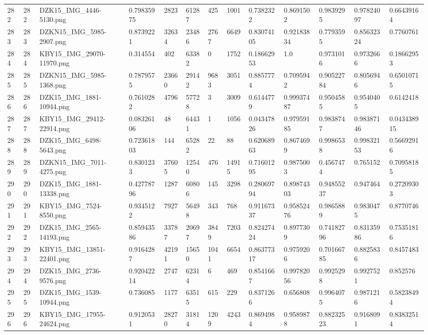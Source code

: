 \documentclass[11pt, a4paper, twoside]{report}
\begin{document}
\begin{longtable}[c]{@{}lllllllllllll@{}}
282 & 282 & DZK15\_IMG\_4446-5130.png & 0.79835975 & 2823 & 61287 & 425 & 1001 & 0.7382322 & 0.8691502 & 0.9839295 & 0.97824097 & 0.66439164 \\
283 & 283 & DZKN15\_IMG\_5985-2907.png & 0.8739221 & 32634 & 23486 & 2767 & 6649 & 0.83074105 & 0.92183834 & 0.7793595 & 0.85632324 & 0.7760761 \\
284 & 284 & KBY15\_IMG\_29070-11970.png & 0.314554 & 402 & 63382 & 0 & 1752 & 0.18662953 & 1.0 & 0.9731016 & 0.9732666 & 0.18662953 \\
285 & 285 & DZKN15\_IMG\_5985-1368.png & 0.7879575 & 23660 & 29142 & 9683 & 3051 & 0.8857774 & 0.7095942 & 0.90522784 & 0.8056946 & 0.65010715 \\
286 & 286 & DZK15\_IMG\_1881-10944.png & 0.7610282 & 4796 & 57728 & 3 & 3009 & 0.6144779 & 0.99937487 & 0.9504585 & 0.9540405 & 0.6142418 \\
287 & 287 & KBY15\_IMG\_29412-22914.png & 0.08326106 & 48 & 64431 & 1 & 1056 & 0.04347826 & 0.97959185 & 0.9838747 & 0.98387146 & 0.043438915 \\
288 & 288 & DZK15\_IMG\_6498-5643.png & 0.72361803 & 144 & 65282 & 22 & 88 & 0.62068963 & 0.8674699 & 0.9986538 & 0.99832153 & 0.56692916 \\
289 & 289 & DZKN15\_IMG\_7011-4275.png & 0.8301233 & 37605 & 12540 & 476 & 14915 & 0.71601295 & 0.9875003 & 0.4567474 & 0.765152 & 0.70958185 \\
290 & 290 & DZK15\_IMG\_1881-13338.png & 0.42778796 & 1287 & 60806 & 145 & 3298 & 0.28069794 & 0.89874303 & 0.94855237 & 0.947464 & 0.27209303 \\
291 & 291 & KBY15\_IMG\_7524-8550.png & 0.9345122 & 7927 & 56498 & 343 & 768 & 0.91167337 & 0.95852476 & 0.9865889 & 0.9830475 & 0.8770746 \\
292 & 292 & DZK15\_IMG\_2565-14193.png & 0.85943586 & 33787 & 20697 & 3849 & 7203 & 0.82427424 & 0.8977309 & 0.74182796 & 0.83135986 & 0.75351816 \\
293 & 293 & KBY15\_IMG\_13851-22401.png & 0.9164287 & 42191 & 15650 & 1041 & 6654 & 0.86377317 & 0.9759206 & 0.70166785 & 0.8825836 & 0.8457483 \\
294 & 294 & DZK15\_IMG\_2736-9576.png & 0.92042214 & 2747 & 62314 & 6 & 469 & 0.8541667 & 0.99782056 & 0.9925298 & 0.9927521 & 0.852576 \\
295 & 295 & DZK15\_IMG\_1539-10944.png & 0.736085 & 1177 & 63515 & 615 & 229 & 0.8371266 & 0.656808 & 0.9964075 & 0.9871216 & 0.58238494 \\
296 & 296 & KBY15\_IMG\_17955-24624.png & 0.9120531 & 28270 & 31814 & 1209 & 4243 & 0.8694984 & 0.9589878 & 0.88232523 & 0.9168091 & 0.83832514 \\

\end{longtable}
\end{document}
